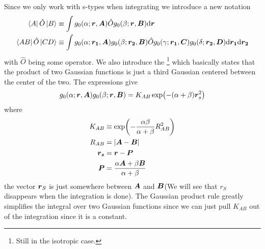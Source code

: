     Since we only work with s-types when integrating we introduce a new notation
        \begin{equation}
            \begin{aligned}
                \bra{A}\hat{O}\ket{B} &\equiv \int g_0(\alpha;\boldsymbol{{r}},\boldsymbol{{A}})
                \hat{O} g_0(\beta;\boldsymbol{{r}},\boldsymbol{{B}}) \mathrm{d}\boldsymbol{{r}}\\
                \bra{AB}\hat{O}\ket{CD} &\equiv \int
                g_0(\alpha;\boldsymbol{{r_1}},\boldsymbol{{A}})g_0(\beta;\boldsymbol{{r_2}},\boldsymbol{{B}})
                \hat{O} g_0(\gamma;\boldsymbol{{r_1}},\boldsymbol{{C}})
                g_0(\delta;\boldsymbol{{r_2}},\boldsymbol{{D}}) \mathrm{d}\boldsymbol{{r_1}} \mathrm{d}\boldsymbol{{r_2}}\\
            \end{aligned}
        \end{equation}
    with $\hat{O}$ being some operator. We also introduce the \footnote{Still in the isotropic case.} which basically states
    that the product of two Gaussian functions is just a third Gaussian
    centered between the center of the two.  The expressions give
        \begin{equation}
            g_0(\alpha;\boldsymbol{{r}},\boldsymbol{{A}})g_0(\beta;\boldsymbol{{r}},\boldsymbol{{B}}) =
            K_{AB}\exp(-(\alpha+\beta)\boldsymbol{{r}}^2_s)
            \label{eq:gaussianProductRule}
        \end{equation}
    where
        \begin{equation}
            \begin{aligned}
                K_{AB} &\equiv \exp(-\frac{\alpha\beta}{\alpha+\beta}R^2_{AB})
                \\
                R_{AB} &= \abs{\boldsymbol{{A}} - \boldsymbol{{B}}} \\
                \boldsymbol{{r_s}} &= \boldsymbol{{r}} - \boldsymbol{{P}} \\
                \boldsymbol{{P}} &= \frac{\alpha\boldsymbol{{A}} +
                \beta\boldsymbol{{B}}}{\alpha + \beta}
            \end{aligned}
        \end{equation}
    the vector $\boldsymbol{{r}}_S$ is just somewhere between $\boldsymbol{{A}}$ and
    $\boldsymbol{{B}}$(We will see that $r_S$ disappears when the integration is done).
    The Gaussian product rule greatly simplifies the integral over two Gaussian
    functions since we can just pull $K_{AB}$ out of the integration since it
    is a constant.

